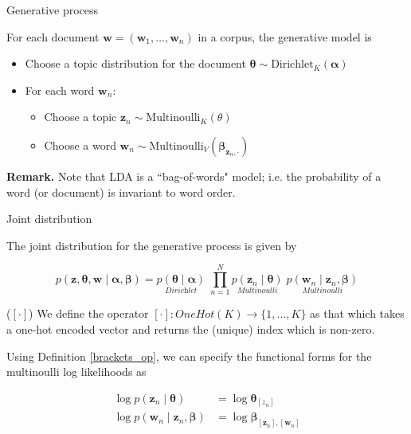 \documentclass[10pt]{beamer}
\newcommand{\ds}{\displaystyle}
\newcommand{\+}[1]{\ensuremath{{\boldsymbol #1}}} %
\newcommand{\cond}{\; | \;}
\newcommand{\set}[1] { \{  {#1} \} }
\newcommand{\explainterm}[2]{\underset{\textit{#1}}{#2}}
\begin{document}
\begin{frame}{Generative process} 

For each document $\+w=(\+w_1, \hdots, \+w_n)$ in a corpus, the generative model is   

\vfill

\begin{itemize}
\item Choose a topic distribution for the document $\+\theta \sim \text{Dirichlet}_K (\+\alpha)$
\item For each word $\+w_n$:

	\begin{itemize}
	\item Choose a topic  $\+z_n \sim \text{Multinoulli}_K (\theta)$ 
	\item Choose a word $\+w_n \sim \text{Multinoulli}_V (\+\beta_{\+z_n, \cdot})$
	\end{itemize}
\end{itemize}


\vfill \vfill \vfill

\textbf{Remark.} Note that LDA is a ``bag-of-words" model; i.e. the probability of a word (or document) is invariant to word order.

\end{frame}






\begin{frame}{Joint distribution}

The joint distribution for the generative process is given by 

\begin{equation}
p(\+z, \+\theta, \+w \cond \+\alpha, \+\beta)  = \explainterm{Dirichlet}{p(\+\theta \cond \+\alpha)} \; \ds\prod_{n=1}^N \explainterm{Multinoulli}{p(\+z_n \cond \+\theta)} \; \explainterm{Multinoulli}{p(\+w_n \cond \+z_n, \+\beta)}
\label{lda_joint}
\end{equation}


\begin{definition}{($[\cdot]$)}\label{brackets_op}
We define the operator  $[\cdot] : OneHot(K) \to \set{1,...,K}$ as that which takes a one-hot encoded vector and returns the (unique) index which is non-zero.
\end{definition} 

Using Definition \ref{brackets_op}, we can specify the functional forms for the multinoulli log likelihoods as

\begin{align}
\log p(\+z_n \cond \+\theta) &= \log \+\theta_{[z_n]} \label{lda_log_like_latent} \\
\log p(\+w_n \cond \+z_n, \+\beta) &=  \log \+\beta_{[\+z_n], [\+w_n]} \label{lda_log_like_observed}
\end{align}


\end{frame}
\end{document}
